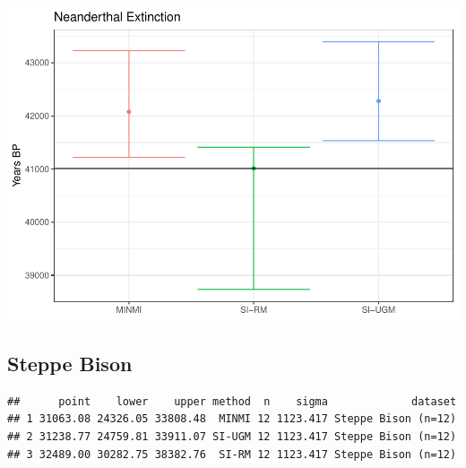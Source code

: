 \documentclass[
]{article}
\newenvironment{Shaded}{\begin{snugshade}}{\end{snugshade}}
\newcommand{\AttributeTok}[1]{\textcolor[rgb]{0.77,0.63,0.00}{#1}}
\newcommand{\DecValTok}[1]{\textcolor[rgb]{0.00,0.00,0.81}{#1}}
\newcommand{\FunctionTok}[1]{\textcolor[rgb]{0.00,0.00,0.00}{#1}}
\newcommand{\NormalTok}[1]{#1}
\newcommand{\OtherTok}[1]{\textcolor[rgb]{0.56,0.35,0.01}{#1}}
\newcommand{\SpecialCharTok}[1]{\textcolor[rgb]{0.00,0.00,0.00}{#1}}
\newcommand{\StringTok}[1]{\textcolor[rgb]{0.31,0.60,0.02}{#1}}
\begin{document}
\includegraphics{applications_files/figure-latex/unnamed-chunk-8-1.pdf}

\hypertarget{steppe-bison}{%
\subsection{Steppe Bison}\label{steppe-bison}}

\begin{Shaded}
\end{Shaded}

\begin{verbatim}
##      point    lower    upper method  n    sigma             dataset
## 1 31063.08 24326.05 33808.48  MINMI 12 1123.417 Steppe Bison (n=12)
## 2 31238.77 24759.81 33911.07 SI-UGM 12 1123.417 Steppe Bison (n=12)
## 3 32489.00 30282.75 38382.76  SI-RM 12 1123.417 Steppe Bison (n=12)
\end{verbatim}
\end{document}
